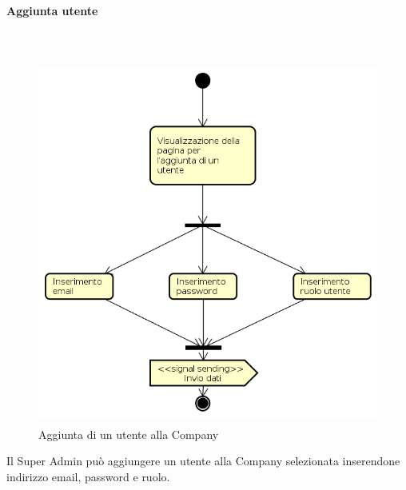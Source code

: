 \paragraph{Aggiunta utente} \mbox{} \\
\begin{figure}[H]
\begin{center}
\includegraphics[height=12cm]{res/sections/backend/activities/aggiuntaUtenteSA.png}
\caption{Aggiunta di un utente alla Company}
\end{center}
\end{figure}
Il Super Admin può aggiungere un utente alla Company selezionata inserendone indirizzo email, password e ruolo. 
